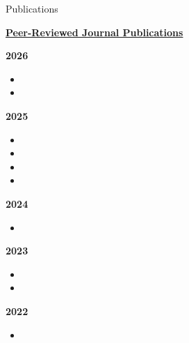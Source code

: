 \documentclass{resume} %
\begin{document}
\begin{rSection}{Publications}
    
\underline{{\bf\Large Peer-Reviewed Journal Publications}}

{\bf\large 2026}
\begin{itemize}
\item {} %
\item {}
\end{itemize}

{\bf\large 2025}
\begin{itemize}
\item {} %
\item {} %
\item {}  %
\item {} %
\end{itemize}


{\bf\large 2024}
\begin{itemize}
    \item {} %

    

\end{itemize}

{\bf\large 2023}
\begin{itemize}
    
 
    \item {} %
    \item {} %

\end{itemize}
{\bf\large 2022}
\begin{itemize}

  \item {}%

\end{itemize}


\end{rSection}
\end{document}
